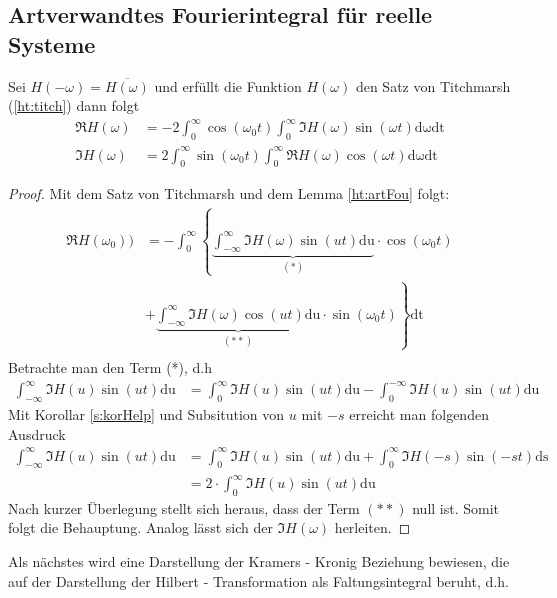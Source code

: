 \subsection{Artverwandtes Fourierintegral für reelle Systeme}
\begin{satz} \label{ht:artFou:reell}
Sei $H(-\omega) = \overline{H(\omega)}$ und erfüllt die Funktion $H(\omega)$ den Satz von Titchmarsh (\ref{ht:titch}) dann folgt 
\begin{align}
	\Re{H(\omega)} &= - 2 \int_0^{\infty} \cos(\omega_0 t) \int_{0}^{\infty}  \Im{H(\omega)} \sin(\omega t) \mathrm{d\omega} \mathrm{dt}\\
	\Im{H(\omega)} &= 2 \int_0^{\infty} \sin(\omega_0 t) \int_{0}^{\infty}  \Re{H(\omega)} \cos(\omega t) \mathrm{d\omega} \mathrm{dt}
\end{align}
\begin{proof}
Mit dem Satz von Titchmarsh und dem Lemma \ref{ht:artFou} folgt:
\begin{align}
	\Re{H(\omega_0)}) &= - \int_0^{\infty} \left\{\underbrace{\int_{-\infty}^{\infty} \Im{H(\omega)} \sin(u t) \mathrm{du}}_{(*)} \cdot \cos(\omega_0 t) \right.\\
	&+\left. \underbrace{\int_{-\infty}^{\infty} \Im{H(\omega)} \cos(u t) \mathrm{du}}_{(**)} \cdot \sin(\omega_0 t) \right\}\mathrm{dt}\\
\end{align}
Betrachte man den Term (*), d.h
\begin{align}
	 \int_{-\infty}^{\infty} \Im{H(u)} \sin(u t) \mathrm{du} 
	 &=\int_{0}^{\infty} \Im{H(u)} \sin(u t) \mathrm{du}  - \int_{0}^{-\infty} \Im{H(u)} \sin(u t) \mathrm{du} 
\end{align}
Mit Korollar \ref{s:korHelp} und Subsitution von $u$ mit $-s$ erreicht man folgenden Ausdruck 
\begin{align}
	\int_{-\infty}^{\infty} \Im{H(u)} \sin(u t) \mathrm{du} &= \int_{0}^{\infty} \Im{H(u)} \sin(u t) \mathrm{du}  +  \int_{0}^{\infty} \Im{H(-s)} \sin(-s t) \mathrm{ds} \\
	&= 2 \cdot \int_{0}^{\infty} \Im{H(u)} \sin(u t) \mathrm{du}
\end{align}
Nach kurzer Überlegung stellt sich heraus, dass der Term $(**)$ null ist. Somit folgt die Behauptung. Analog lässt sich der $\Im{H(\omega)}$ herleiten.
\end{proof}
\end{satz} 
Als nächstes wird eine Darstellung der Kramers - Kronig Beziehung bewiesen, die auf der Darstellung der Hilbert - Transformation als Faltungsintegral beruht, d.h.
